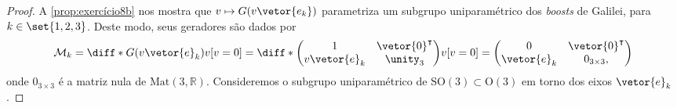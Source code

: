 \begin{proof}
    A \cref{prop:exercício8b} nos mostra que \(v \mapsto G(v\vetor{e_k})\) parametriza um subgrupo uniparamétrico dos \emph{boosts} de Galilei, para \(k \in \set{1,2,3}\). Deste modo, seus geradores são dados por
    \begin{equation*}
        \mathcal{M}_k = \diff*{G(v \vetor{e}_k)}{v}[v=0] = \diff*{\begin{pmatrix}
                1 & \vetor{0}^\intercal\\
                v\vetor{e}_k & \unity_3
        \end{pmatrix}}{v}[v=0] = \begin{pmatrix}
                0 & \vetor{0}^\intercal\\
                \vetor{e}_k & 0_{3\times 3},
        \end{pmatrix}
    \end{equation*}
    onde \(0_{3\times3}\) é a matriz nula de \(\mathrm{Mat}(3,\mathbb{R})\). Consideremos o subgrupo uniparamétrico de \(\mathrm{SO}(3) \subset \mathrm{O}(3)\) em torno dos eixos \(\vetor{e}_k\).



\end{proof}
